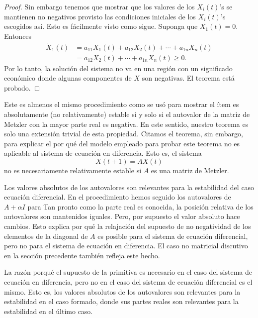 \begin{theorem}
\begin{proof}
	Sin embargo tenemos que mostrar que los valores de los $X_{i}\left(t\right)$'s se mantienen no negativos provisto las condiciones iniciales de los $X_{i}\left(t\right)$'s escogidos así. Esto es fácilmente visto como sigue. Suponga que $X_{1}\left(t\right)=0$. Entonces
	\begin{align*}
	\dot{X}_{1}\left(t\right)
	&=a_{11}X_{1}\left(t\right)+a_{12}X_{2}\left(t\right)+\cdots+a_{1n}X_{n}\left(t\right)\\
	&=a_{12}X_{2}\left(t\right)+\cdots+a_{1n}X_{n}\left(t\right)\geq0.
	\end{align*}
	Por lo tanto, la solución del sistema no va en una región con un significado económico donde algunas componentes de $X$ son negativas. El teorema está probado.
\end{proof}

Este es almenos el mismo procedimiento como se usó para mostrar el ítem %
es absolutamente (no relativamente) estable si y solo si el autovalor de la matriz de Metzler con la mayor parte real es negativa. En este sentido, nuestro teorema es solo una extensión trivial de esta propiedad. Citamos el teorema, sin embargo, para explicar el por qué del modelo empleado para probar este teorema no es aplicable al sistema de ecuación en diferencia. Esto es, el sistema \[ X\left(t+1\right)=AX\left(t\right) \] no es necesariamente relativamente estable si $A$ es una matriz de Metzler.
\end{theorem}
Los valores absolutos de los autovalores son relevantes para la estabilidad del caso ecuación diferencial. En el procedimiento hemos seguido %
los autovalores de $A+\alpha I$ para %
Tan pronto como la parte real es conocida, la posición relativa de los autovalores son mantenidos iguales. Pero, por supuesto el valor absoluto hace cambios. Esto explica por qué la relajación del supuesto de no negatividad de los elementos de la diagonal de $A$ es posible para el sistema de ecuación diferencial, pero no para el sistema de ecuación en diferencia. El caso no matricial discutivo en la sección precedente también refleja este hecho.

La razón porqué el supuesto de la primitiva es necesario en el caso del sistema de ecuación en diferencia, pero no en el caso del sistema de ecuación diferencial es el mismo. Esto es, los valores absolutos de los autovalores son relevantes para la estabilidad en el caso formado, donde sus partes reales son relevantes para la estabilidad en el último caso.

